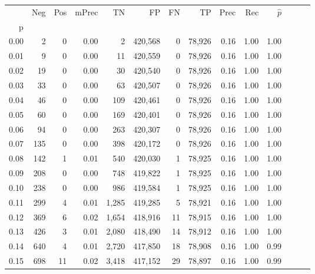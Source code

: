 \begin{tabular}{rrrrrrrrrrrrrr}
\toprule
{} &     Neg &    Pos & mPrec &       TN &       FP &      FN &      TP &  Prec &   Rec & $\hat{p}$ \\
p    &         &        &       &          &          &         &         &       &       &           \\
\midrule
0.00 &       2 &      0 &  0.00 &        2 &  420,568 &       0 &  78,926 &  0.16 &  1.00 &      1.00 \\
0.01 &       9 &      0 &  0.00 &       11 &  420,559 &       0 &  78,926 &  0.16 &  1.00 &      1.00 \\
0.02 &      19 &      0 &  0.00 &       30 &  420,540 &       0 &  78,926 &  0.16 &  1.00 &      1.00 \\
0.03 &      33 &      0 &  0.00 &       63 &  420,507 &       0 &  78,926 &  0.16 &  1.00 &      1.00 \\
0.04 &      46 &      0 &  0.00 &      109 &  420,461 &       0 &  78,926 &  0.16 &  1.00 &      1.00 \\
0.05 &      60 &      0 &  0.00 &      169 &  420,401 &       0 &  78,926 &  0.16 &  1.00 &      1.00 \\
0.06 &      94 &      0 &  0.00 &      263 &  420,307 &       0 &  78,926 &  0.16 &  1.00 &      1.00 \\
0.07 &     135 &      0 &  0.00 &      398 &  420,172 &       0 &  78,926 &  0.16 &  1.00 &      1.00 \\
0.08 &     142 &      1 &  0.01 &      540 &  420,030 &       1 &  78,925 &  0.16 &  1.00 &      1.00 \\
0.09 &     208 &      0 &  0.00 &      748 &  419,822 &       1 &  78,925 &  0.16 &  1.00 &      1.00 \\
0.10 &     238 &      0 &  0.00 &      986 &  419,584 &       1 &  78,925 &  0.16 &  1.00 &      1.00 \\
0.11 &     299 &      4 &  0.01 &    1,285 &  419,285 &       5 &  78,921 &  0.16 &  1.00 &      1.00 \\
0.12 &     369 &      6 &  0.02 &    1,654 &  418,916 &      11 &  78,915 &  0.16 &  1.00 &      1.00 \\
0.13 &     426 &      3 &  0.01 &    2,080 &  418,490 &      14 &  78,912 &  0.16 &  1.00 &      1.00 \\
0.14 &     640 &      4 &  0.01 &    2,720 &  417,850 &      18 &  78,908 &  0.16 &  1.00 &      0.99 \\
0.15 &     698 &     11 &  0.02 &    3,418 &  417,152 &      29 &  78,897 &  0.16 &  1.00 &      0.99 \\

\end{tabular}
